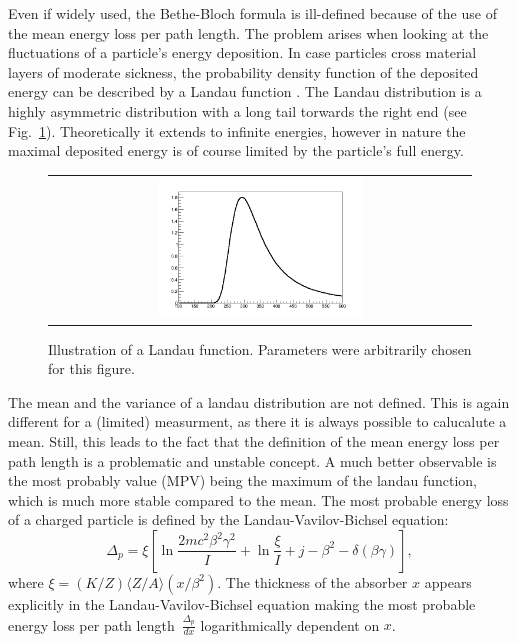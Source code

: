 Even if widely used, the Bethe-Bloch formula is ill-defined because of the use of the mean energy loss per path length.
The problem arises when looking at the fluctuations of a particle's energy deposition.
In case particles cross material layers of moderate sickness, the probability density function of the deposited energy can be described by a Landau function \cite{bib:Landau_1944}. 
The Landau distribution is a highly asymmetric distribution with a long tail torwards the right end (see Fig.~\ref{fig:landau}).
Theoretically it extends to infinite energies, however in nature the maximal deposited energy is of course limited by the particle's full energy.
\begin{figure}[!t]
  \centering 
  \begin{tabular}{c}
  \includegraphics[width=0.5\textwidth]{figures/analysis/landau.png}
  \end{tabular}
  \caption{Illustration of a Landau function. Parameters were arbitrarily chosen for this figure.} 
  \label{fig:landau}
\end{figure}
The mean and the variance of a landau distribution are not defined. 
This is again different for a (limited) measurment, as there it is always possible to calucalute a mean.
Still, this leads to the fact that the definition of the mean energy loss per path length is a problematic and unstable concept.
A much better observable is the most probably value (MPV) being the maximum of the landau function, which is much more stable compared to the mean. 
The most probable energy loss of a charged particle is defined by the Landau-Vavilov-Bichsel equation:
\begin{equation}
\Delta_p = \xi \left[ \ln \frac{2mc^2\beta^2\gamma^2}{I}  + \ln\frac{\xi}{I} + j - \beta^2 - \delta(\beta\gamma)  \right],
\end{equation}
where $\xi=(K/Z)\langle Z/A \rangle (x/\beta^2)$. 
The thickness of the absorber $x$ appears explicitly in the Landau-Vavilov-Bichsel equation making the most probable energy loss per path \mbox{length $\frac{\Delta_p}{dx}$} logarithmically dependent on $x$.
